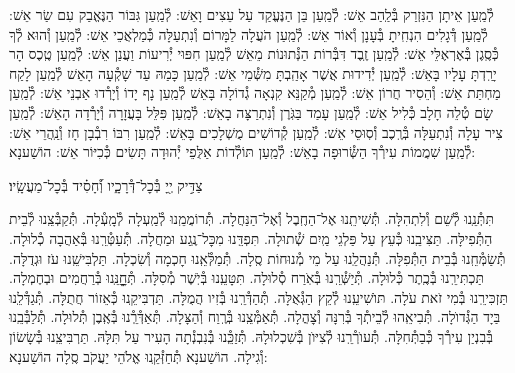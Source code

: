 \documentclass[twoside, openany, parskip=half, 11pt]{book}
\begin{document}
לְ֯מַֽעַן אֵיתָן הַנִּזְרַק בְּ֯לַֽהַב אֵשׁ: לְ֯מַֽעַן בֵּן הַנֶּעֱקַד עַל עֵצִים וָאֵשׁ: לְ֯מַֽעַן גִּבּוֹר הַנֶּאֱבַק עִם שַׂר אֵשׁ: לְ֯מַֽעַן דְּ֯גָלִים הִנְחִֽיתָ בְּ֯עָנָן וְ֯אוֹר אֵשׁ: לְ֯מַֽעַן הֹעֲלָה לַמָּרוֹם וְ֯נִתְעַלָּה כְּ֯מַלְאֲכֵי אֵשׁ: לְ֯מַֽעַן וְ֯הוּא לְ֯ךָ כְּ֯סֶֽגֶן בְּ֯אֶרְאֶלֵּי אֵשׁ: לְ֯מַֽעַן זֶֽבֶד דִּבְּ֯רוֹת הַנְּ֯תוּנוֹת מֵאֵשׁ לְ֯מַֽעַן חִפּוּי יְ֯רִיעוֹת וַעֲנַן אֵשׁ: לְ֯מַֽעַן טֶֽכֶס הָר יָרַֽדְתָּ עָלָיו בָּאֵשׁ: לְ֯מַֽעַן יְ֯דִידוּת אֲשֶׁר אָהַֽבְתָּ מִשְּׁ֯מֵי אֵשׁ: לְ֯מַֽעַן כָּמַהּ עַד שָׁקְ֯עָה הָאֵשׁ לְ֯מַֽעַן לָקַח מַחְתַּת אֵשׁ: וְ֯הֵסִיר חֲרוֹן אֵשׁ: לְ֯מַֽעַן מְ֯קַנֵּא קִנְאָה גְ֯דוֹלָה בָּאֵשׁ לְ֯מַֽעַן נָף יָדוֹ וְ֯יָרְ֯דוּ אַבְנֵי אֵשׁ: לְ֯מַֽעַן שָׂם טְ֯לֵה חָלָב כְּ֯לִיל אֵשׁ: לְ֯מַֽעַן עָמַד בַּגֹּֽרֶן וְ֯נִתְרַצָּה בָאֵשׁ: לְ֯מַֽעַן פִּלֵּל בָּעֲזָרָה וְ֯יָרְ֯דָה הָאֵשׁ: לְ֯מַֽעַן צִיר עָלָה וְ֯נִתְעַלָּה בְּ֯רֶֽכֶב וְ֯סֽוּסֵי אֵשׁ: לְ֯מַֽעַן קְ֯דוֹשִׁים מֻשְׁלָכִים בָּאֵשׁ: לְ֯מַֽעַן רִבּוֹ רִבְ֯בָן חָז וְ֯נַֽהֲרֵי אֵשׁ:
לְ֯מַֽעַן שִׁמֲמוֹת עִירְ֯ךָ הַשְּׂ֯רוּפָה בָאֵשׁ:
לְ֯מַֽעַן תּוֹלְ֯דוֹת אַלֻּפֵי יְ֯הוּדָה תָּשִׂים כְּ֯כִיּוֹר אֵשׁ: הוֹשַׁענָא:

צַדִּ֣יק יְ֖יָ בְּ֯כׇל־דְּ֯רָכָ֑יו וְ֯֝חָסִ֗יד בְּ֯כׇל־מַעֲשָֽׂיו׃

תִּתְּ֯נֵֽנוּ לְ֯שֵׁם וְ֯לִתְהִלָּה.
תְּ֯שִׁיתֵֽנוּ אֶל־הַחֶֽבֶל וְ֯אֶל־הַנַּחֲלָה.
תְּ֯רוֹמֲמֵֽנוּ לְ֯מַֽעְלָה לְ֯מָֽעְ֯לָה.
תְּ֯קַבְּ֯צֵֽנוּ לְ֯בֵית הַתְּ֯פִילָּה.
תַּצִּיבֵֽנוּ כְּ֯עֵץ עַל פַּלְגֵי מַֽיִם שְׁ֯תוּלָה.
תִּפְדֵּֽנוּ מִכׇּל־נֶֽגַע וּמַחֲלָה.
תְּ֯עַטְּ֯רֵֽנוּ בְּ֯אַהֲבָה כְ֯לוּלָה.
תְּ֯שַׂמְּ֯חֵֽנוּ בְּ֯בֵית הַתְּ֯פִלָּה.
תְּ֯נַהֲלֵֽנוּ עַל מֵי מְ֯נוּחוֹת סֶֽלָה.
תְּ֯מַלְּ֯אֵֽנוּ חׇכְמָה וְ֯שִׂכְלָה.
תַּלְבִּישֵֽׁנוּ עֹז וּגְדֻלָּה.
תַּכְתִּירֵֽנוּ בְּ֯כֶֽתֶר כְּ֯לוּלָה.
תְּ֯יַשְּׁ֯רֵֽנוּ בְּ֯אֹֽרַח סְ֯לוּלָה.
תִּטָּעֵֽנוּ בְּ֯יֹֽשֶׁר מְ֯סִלָּה.
תְּ֯חׇׇׇׇׇנֵּֽנוּ בְּ֯רַחֲמִים וּבְחֶמְלָה.
תַּזְכִּירֵֽנוּ בְּ֯מִי זֹאת עֹלָה.
תּוׂשִׁיעֵֽנוּ לְ֯קֵץ הַגְּ֯אֻלָּה.
תְּ֯הַדְּ֯רֵֽנוּ בְּ֯זִיו הֲמֻלָּה.
תַּדְבִּיקֵֽנוּ כְּ֯אֵזוֹר חֲתֻלָּה.
תְּ֯גַדְּ֯לֵֽנוּ בַּיָד הַגְּ֯דוׂלָה.
תְּ֯בִיאֵֽהוּ לְ֯בֵיתְ֯ךָ בְּ֯רִנָּה וְ֯צׇהֳלָה.
תְּ֯אַמְּ֯צֵֽנוּ בְּ֯רֶֽוַח וְ֯הַצָּלָה.
תְּ֯אַדְּ֯רְֵ֯נוּ בְּ֯אֶֽבֶן תְּ֯לוּלָה.
תְּ֯לַבְּ֯בֵֽנוּ בְּ֯בִנְיַן עִירְ֯ךָ כְּ֯בַתְּ֯חִלָּה.
תְּ֯עוׂרְ֯רֵֽנוּ לְ֯צִיּוׂן בְּ֯שִׁכְלוּלָהּ.
תְּ֯זַכְֵּ֯נוּ בְּ֯נִבְנְ֯תָה הָעִיר עַל תִּלָּהּ.
תַּרְבִּיצֵֽנוּ בְּ֯שָׂשׂוֹן וְ֯גִילָה.
הוֹשַׁענָא תְּ֯חַזְּ֯קֵֽנוּ אֱלֹהֵי יַעֲקֹב סֶֽלָה הוֹשַׁענָא:
\end{document}
